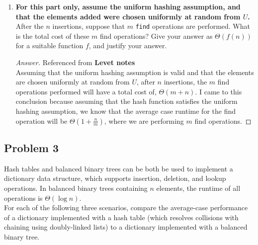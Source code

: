 \documentclass[11pt]{article}
\theoremstyle{definition}
\theoremstyle{definition}
\theoremstyle{definition}
\begin{document}
\begin{enumerate}[label=(\alph*)]
	\item \textbf{For this part only, assume the uniform hashing assumption, and that the elements added were chosen uniformly at random from $U$.} After the $n$ insertions, suppose that $m$ \texttt{find} operations are performed. What is the total cost of these $m$ find operations? Give your answer as $\Theta(f(n))$ for a suitable function $f$, and justify your answer.
    \begin{proof}[Answer] Referenced from \textbf{Levet notes}\\
    Assuming that the uniform hashing assumption is valid and that the elements are chosen uniformly at random from $U$, after $n$ insertions, the $m$ find operations performed will have a total cost of, $\Theta(m + n)$. I came to this conclusion because assuming that the hash function satisfies the uniform hashing assumption, we know that the average case runtime for the find operation will be $\Theta(1+\frac{n}{m})$, where we are performing $m$ find operations. 
    \end{proof}

\vfill
	\end{enumerate} 

\newpage
\subsection{Problem 3}
Hash tables and balanced binary trees can be both be used to implement a dictionary data structure, which supports insertion, deletion, and lookup operations. In balanced binary trees containing $n$ elements, the runtime of all operations is $\Theta(\log n)$.  \\

    \noindent For each of the following three scenarios, compare the average-case performance of a dictionary implemented with a hash table (which resolves collisions with chaining using doubly-linked lists) to a dictionary implemented with a balanced binary tree.
        
\end{document}
